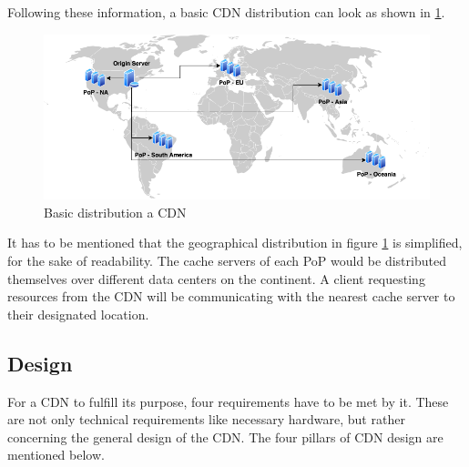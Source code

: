 Following these information, a basic CDN distribution can look as shown in \ref{fig:cdn_general_arch}.

\begin{figure}[!h]
	\centering
	\includegraphics[width=1\textwidth]{Figures/basic_cdn_arch.drawio.png}
	\caption{Basic distribution a CDN}
	\label{fig:cdn_general_arch}
\end{figure}

It has to be mentioned that the geographical distribution in figure \ref{fig:cdn_general_arch} is simplified, for the sake of readability. The cache servers of each PoP would be distributed themselves over different data centers on the continent. A client requesting resources from the CDN will be communicating with the nearest cache server to their designated location.\cite{cdn_general}

\subsection{Design}

For a CDN to fulfill its purpose, four requirements have to be met by it. These are not only technical requirements like necessary hardware, but rather concerning the general design of the CDN.
The four pillars of CDN design are mentioned below.

